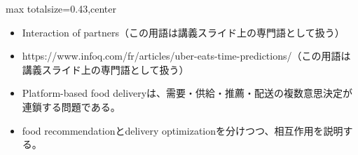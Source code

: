 \clearpage
{}
\begin{minipage}[t]{0.405\textwidth}
\begin{adjustbox}{max totalsize={\textwidth}{0.43\textheight},center}
\begin{minipage}{\textwidth}\scriptsize
{}\begin{itemize}
\item Interaction of partners（この用語は講義スライド上の専門語として扱う）
\item https://www.infoq.com/fr/articles/uber-eats-time-predictions/（この用語は講義スライド上の専門語として扱う）
\end{itemize}\begin{itemize}
\item Platform-based food deliveryは、需要・供給・推薦・配送の複数意思決定が連鎖する問題である。
\item food recommendationとdelivery optimizationを分けつつ、相互作用を説明する。
\end{itemize}
\end{minipage}
\end{adjustbox}
\end{minipage}\hfill
